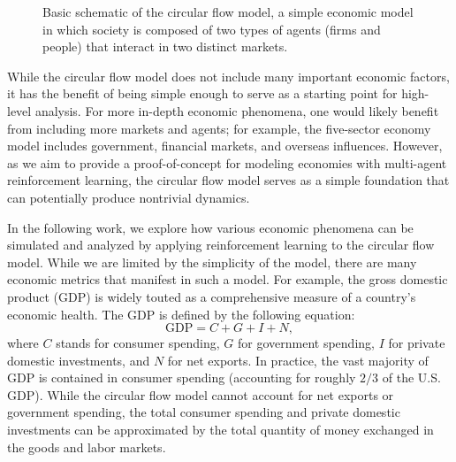 \documentclass[twoside,twocolumn]{article}
\begin{document}
\begin{figure}[h]
  \centering
  \caption{Basic schematic of the circular flow model, a simple economic model in which society is composed of two types of agents (firms and people) that interact in two distinct markets.} \label{fig:circularflow}
\end{figure}
\medskip
While the circular flow model does not include many important economic factors, it has the benefit of being simple enough to serve as a starting point for high-level analysis. For more in-depth economic phenomena, one would likely benefit from including more markets and agents; for example, the five-sector economy model includes government, financial markets, and overseas influences. However, as we aim to provide a proof-of-concept for modeling economies with multi-agent reinforcement learning, the circular flow model serves as a simple foundation that can potentially produce nontrivial dynamics.

\medskip

In the following work, we explore how various economic phenomena can be simulated and analyzed by applying reinforcement learning to the circular flow model. While we are limited by the simplicity of the model, there are many economic metrics that manifest in such a model. For example, the gross domestic product (GDP) is widely touted as a comprehensive measure of a country's economic health. The GDP is defined by the following equation:
\[
  \text{GDP} = C + G + I + N,
\]
where $C$ stands for consumer spending, $G$ for government spending, $I$ for private domestic investments, and $N$ for net exports. In practice, the vast majority of GDP is contained in consumer spending (accounting for roughly $2/3$ of the U.S. GDP). While the circular flow model cannot account for net exports or government spending, the total consumer spending and private domestic investments can be approximated by the total quantity of money exchanged in the goods and labor markets.
\end{document}
